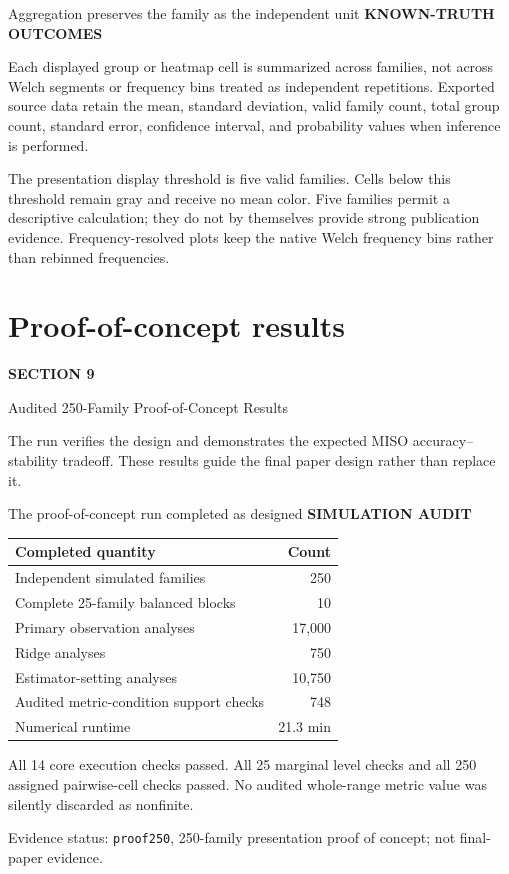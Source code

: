 \documentclass[aspectratio=169,11pt]{beamer}
\newcommand{\sectionlabel}[1]{%
  {\color{Accent}\fontsize{8}{9.5}\selectfont\bfseries\MakeUppercase{#1}}\par\vspace{0.12cm}}
\newcommand{\sourcefooter}[1]{%
  \par\vfill{\color{Muted}\fontsize{6.8}{8}\selectfont #1}}
\newcommand{\proofnote}{%
  \sourcefooter{Evidence status: \texttt{proof250}, 250-family presentation proof of concept; not final-paper evidence.}}
\newcommand{\sectionframe}[3]{%
  \begin{frame}[plain]
    \vspace{0.7cm}
    {\color{Accent}\fontsize{10}{12}\selectfont\bfseries SECTION #1}\par\vspace{0.45cm}
    {\color{Ink}\fontsize{24.5}{28}\selectfont #2}\par\vspace{0.55cm}
    {\color{Body}\fontsize{14.5}{19}\selectfont #3}
  \end{frame}}
\begin{document}
\begin{frame}{Aggregation preserves the family as the independent unit}
\sectionlabel{Known-Truth Outcomes}
Each displayed group or heatmap cell is summarized across families, not across
Welch segments or frequency bins treated as independent repetitions. Exported
source data retain the mean, standard deviation, valid family count, total group
count, standard error, confidence interval, and probability values when
inference is performed.

\vspace{0.45cm}
The presentation display threshold is five valid families. Cells below this
threshold remain gray and receive no mean color. Five families permit a
descriptive calculation; they do not by themselves provide strong publication
evidence. Frequency-resolved plots keep the native Welch frequency bins rather
than rebinned frequencies.
\end{frame}


\section{Proof-of-concept results}
\sectionframe{9}{Audited 250-Family Proof-of-Concept Results}{%
The run verifies the design and demonstrates the expected MISO accuracy--stability
tradeoff. These results guide the final paper design rather than replace it.}

\begin{frame}{The proof-of-concept run completed as designed}
\sectionlabel{Simulation Audit}
\begin{tabular}{p{}r}
\toprule
\textbf{Completed quantity} & \textbf{Count}\\
\midrule
Independent simulated families & 250\\
Complete 25-family balanced blocks & 10\\
Primary observation analyses & 17,000\\
Ridge analyses & 750\\
Estimator-setting analyses & 10,750\\
Audited metric-condition support checks & 748\\
Numerical runtime & 21.3 min\\
\bottomrule
\end{tabular}

\vspace{0.35cm}
All 14 core execution checks passed. All 25 marginal level checks and all 250
assigned pairwise-cell checks passed. No audited whole-range metric value was
silently discarded as nonfinite.
\proofnote
\end{frame}
\end{document}
